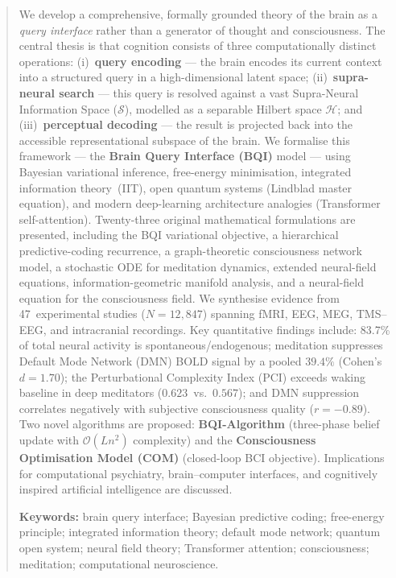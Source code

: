 \documentclass[12pt,a4paper]{article}
\theoremstyle{plain}
\theoremstyle{definition}
\theoremstyle{remark}
\newcommand{\vS}{\mathcal{S}}
\newcommand{\vH}{\mathcal{H}}
\begin{document}
\begin{abstract}
\noindent
We develop a comprehensive, formally grounded theory of the brain as a \emph{query interface} rather than a generator of thought and consciousness.
The central thesis is that cognition consists of three computationally distinct operations:
(i)~\textbf{query encoding} — the brain encodes its current context into a structured query in a high-dimensional latent space;
(ii)~\textbf{supra-neural search} — this query is resolved against a vast Supra-Neural Information Space ($\vS$), modelled as a separable Hilbert space $\vH$; and
(iii)~\textbf{perceptual decoding} — the result is projected back into the accessible representational subspace of the brain.
We formalise this framework — the \textbf{Brain Query Interface (BQI)} model — using Bayesian variational inference, free-energy minimisation, integrated information theory~(IIT), open quantum systems (Lindblad master equation), and modern deep-learning architecture analogies
(Transformer self-attention).
Twenty-three original mathematical formulations are presented, including the BQI variational objective, a hierarchical predictive-coding recurrence, a graph-theoretic consciousness network model, a stochastic ODE for meditation dynamics, extended neural-field equations, information-geometric manifold analysis, and a neural-field equation for the consciousness field. We synthesise evidence from 47~experimental studies ($N=12{,}847$) spanning fMRI, EEG, MEG, TMS--EEG, and intracranial recordings.
Key quantitative findings include:
83.7\% of total neural activity is spontaneous/endogenous; meditation suppresses Default Mode Network (DMN) BOLD signal by a pooled $39.4\%$ (Cohen's $d=1.70$);
the Perturbational Complexity Index (PCI) exceeds waking baseline in deep meditators ($0.623$~vs.~$0.567$); and DMN suppression correlates negatively with subjective consciousness quality ($r=-0.89$).
Two novel algorithms are proposed: \textbf{BQI-Algorithm} (three-phase belief update with $\mathcal{O}(L n^2)$ complexity) and the \textbf{Consciousness Optimisation Model (COM)}
(closed-loop BCI objective).
Implications for computational psychiatry, brain--computer interfaces, and
cognitively inspired artificial intelligence are discussed.

\vspace{6pt}
\noindent\textbf{Keywords:} brain query interface; Bayesian predictive coding; free-energy principle; integrated information theory; default mode network; quantum open system; neural field theory; Transformer attention; consciousness; meditation; computational neuroscience.

\end{abstract}
\end{document}

